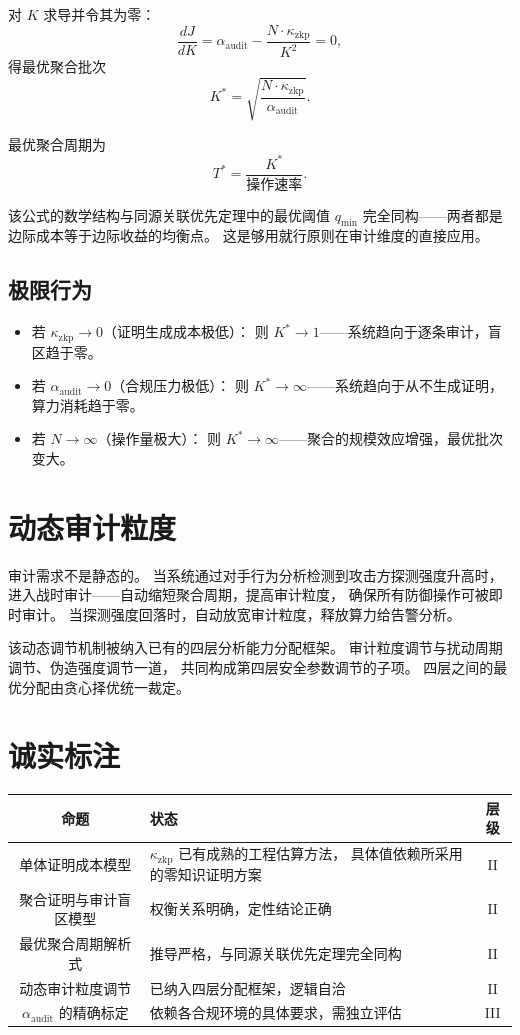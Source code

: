 \documentclass[11pt,a4paper]{article}
\begin{document}
对 \(K\) 求导并令其为零：
\[
\frac{dJ}{dK} = \alpha_{\text{audit}} - \frac{N \cdot \kappa_{\text{zkp}}}{K^2} = 0,
\]
得最优聚合批次
\[
K^* = \sqrt{\frac{N \cdot \kappa_{\text{zkp}}}{\alpha_{\text{audit}}}}.
\]

最优聚合周期为
\[
T^* = \frac{K^*}{\text{操作速率}}.
\]

该公式的数学结构与同源关联优先定理中的最优阈值 \(q_{\min}\)
完全同构——两者都是边际成本等于边际收益的均衡点。
这是够用就行原则在审计维度的直接应用。

\subsection{极限行为}

\begin{itemize}
    \item 若 \(\kappa_{\text{zkp}} \to 0\)（证明生成成本极低）：
          则 \(K^* \to 1\)——系统趋向于逐条审计，盲区趋于零。
    \item 若 \(\alpha_{\text{audit}} \to 0\)（合规压力极低）：
          则 \(K^* \to \infty\)——系统趋向于从不生成证明，算力消耗趋于零。
    \item 若 \(N \to \infty\)（操作量极大）：
          则 \(K^* \to \infty\)——聚合的规模效应增强，最优批次变大。
\end{itemize}

\section{动态审计粒度}

审计需求不是静态的。
当系统通过对手行为分析检测到攻击方探测强度升高时，
进入战时审计——自动缩短聚合周期，提高审计粒度，
确保所有防御操作可被即时审计。
当探测强度回落时，自动放宽审计粒度，释放算力给告警分析。

该动态调节机制被纳入已有的四层分析能力分配框架。
审计粒度调节与扰动周期调节、伪造强度调节一道，
共同构成第四层安全参数调节的子项。
四层之间的最优分配由贪心择优统一裁定。

\section{诚实标注}

\begin{center}
\begin{xltabular}{\textwidth}{c|X|c}
\toprule
\textbf{命题} & \textbf{状态} & \textbf{层级} \\
\midrule
单体证明成本模型 &
\(\kappa_{\text{zkp}}\) 已有成熟的工程估算方法，
具体值依赖所采用的零知识证明方案 &
II \\
聚合证明与审计盲区模型 &
权衡关系明确，定性结论正确 &
II \\
最优聚合周期解析式 &
推导严格，与同源关联优先定理完全同构 &
II \\
动态审计粒度调节 &
已纳入四层分配框架，逻辑自洽 &
II \\
\(\alpha_{\text{audit}}\) 的精确标定 &
依赖各合规环境的具体要求，需独立评估 &
III \\
\bottomrule
\end{xltabular}
\end{center}
\end{document}
